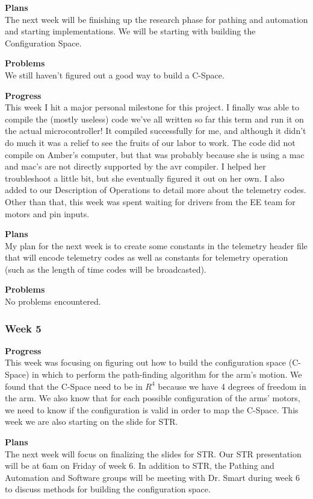 \textbf{Plans} \\ 
The next week will be finishing up the research phase for pathing and automation and starting implementations. We will be starting with building the Configuration Space.

\textbf{Problems} \\ 
We still haven't figured out a good way to build a C-Space.

\textbf{Progress} \\
This week I hit a major personal milestone for this project. I finally was 
able to compile the (mostly useless) code we've all written so far this term 
and run it on the actual microcontroller! It compiled successfully for me, and
although it didn't do much it was a relief to see the fruits of our labor to 
work. The code did not compile on Amber's computer, but that was probably 
because she is using a mac and mac's are not directly supported by the avr 
compiler. I helped her troubleshoot a little bit, but she eventually figured 
it out on her own. I also added to our Description of Operations to detail 
more about the telemetry codes. Other than that, this week was spent waiting 
for drivers from the EE team for motors and pin inputs.

\textbf{Plans} \\
My plan for the next 
week is to create some constants in the telemetry header file that will encode
telemetry codes as well as constants for telemetry operation (such as the 
length of time codes will be broadcasted).

\textbf{Problems} \\
No problems encountered.

\subsubsection{Week 5}
\textbf{Progress} \\ 
This week was focusing on figuring out how to build the configuration space (C-Space) in which to perform the path-finding algorithm for the arm's motion. We found that the C-Space need to be in \(R^4\) because we have 4 degrees of freedom in the arm. We also know that for each possible configuration of the arms' motors, we need to know if the configuration is valid in order to map the C-Space. This week we are also starting on the slide for STR.

\textbf{Plans} \\ 
The next week will focus on finalizing the slides for STR. Our STR presentation will be at 6am on Friday of week 6. In addition to STR, the Pathing and Automation and Software groups will be meeting with Dr. Smart during week 6 to discuss methods for building the configuration space.

